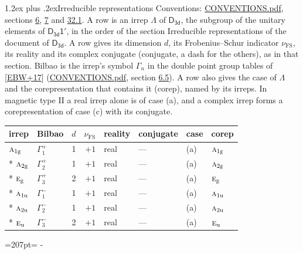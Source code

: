 \documentclass[10pt,a4paper]{article}
\makeatletter
\renewcommand\section{\@startsection{section}{1}{\z@}{-3ex plus -1ex minus -.2ex}%
  {1.2ex plus .2ex}{\normalfont\large\sffamily\bfseries\color{parttitle}}}
\newcommand{\needspace}[1]{\par\penalty-100\begingroup\dimen0=#1\relax\dimen2=\pagegoal
  \advance\dimen2-\pagetotal\ifdim\dimen0>\dimen2\relax\ifdim\dimen2>0pt\vfil\break\fi\fi
  \endgroup}
\numberwithin{equation}{section}
\newcommand{\grp}[1]{\mathsf{#1}}
\newcommand{\irr}[1]{\text{\normalfont\scshape #1}}
\newcommand{\ptag}[1]{\mathrm{#1}}
\newcommand{\fsind}{\nu_{\mathrm{FS}}}
\makeatother
\begin{document}
\section{Irreducible representations}\label{s:irreps}
Conventions: \href{../../CONVENTIONS.pdf}{CONVENTIONS.pdf}, sections \href{../../../rotation/CONVENTIONS.pdf\#conv.6}{6}, \href{../../../rotation/CONVENTIONS.pdf\#conv.7}{7} and \href{../../CONVENTIONS.pdf\#conv.32.1}{32.1}.
\leavevmode\label{n:irrep.Delta}A row is an irrep $\Lambda$ of $\grp{D_{3d}}$, the subgroup of the unitary elements of $\grp{D_{3d}1'}$, in the order of the section Irreducible representations of the document of \href{../../../rotation/data/pdf/D3d.pdf}{$\grp{D_{3d}}$}. \label{n:index.dimension}\label{n:index.frobenius}\label{n:head.irrep}\label{n:head.reality}\label{n:head.conjugate}A row gives its dimension $d$, its Frobenius--Schur indicator $\fsind$, its reality and its complex conjugate (conjugate, a dash for the others), as in that section. \label{n:head.bilbao}\label{n:irrep.alias.gamma}Bilbao is the irrep's symbol $\Gamma_n$ in the double point group tables of [\href{../../../REFERENCES.pdf\#ref.EBW+17}{EBW+17}] (\href{../../CONVENTIONS.pdf}{CONVENTIONS.pdf}, section \href{../../../rotation/CONVENTIONS.pdf\#conv.6.5}{6.5}). \label{n:head.case.corep}\label{n:head.corep}A row also gives the case of $\Lambda$ and the corepresentation that contains it (corep), named by its irreps. In magnetic type II a real irrep alone is of case (a), and a complex irrep forms a corepresentation of case (c) with its conjugate.
\setlength{\emergencystretch}{2em}\par\setlength{\emergencystretch}{0pt}
{\small\renewcommand{\arraystretch}{1.25}\setlength{\tabcolsep}{4pt}\begin{longtable}{@{}llrrllll@{}}\toprule
irrep & Bilbao & $d$ & $\fsind$ & reality & conjugate & case & corep\\\midrule\endhead
\bottomrule\endfoot\endlastfoot
$\irr{a}_{1\ptag{g}}$ & $\Gamma_{1}^{+}$ & 1 & $+1$ & real & --- & (a) & $\irr{a}_{1\ptag{g}}$\\*
$\irr{a}_{2\ptag{g}}$ & $\Gamma_{2}^{+}$ & 1 & $+1$ & real & --- & (a) & $\irr{a}_{2\ptag{g}}$\\*
$\irr{e}_{\ptag{g}}$ & $\Gamma_{3}^{+}$ & 2 & $+1$ & real & --- & (a) & $\irr{e}_{\ptag{g}}$\\*
$\irr{a}_{1\ptag{u}}$ & $\Gamma_{1}^{-}$ & 1 & $+1$ & real & --- & (a) & $\irr{a}_{1\ptag{u}}$\\*
$\irr{a}_{2\ptag{u}}$ & $\Gamma_{2}^{-}$ & 1 & $+1$ & real & --- & (a) & $\irr{a}_{2\ptag{u}}$\\*
$\irr{e}_{\ptag{u}}$ & $\Gamma_{3}^{-}$ & 2 & $+1$ & real & --- & (a) & $\irr{e}_{\ptag{u}}$\\
\bottomrule\end{longtable}}
\needspace{207pt}
\end{document}
